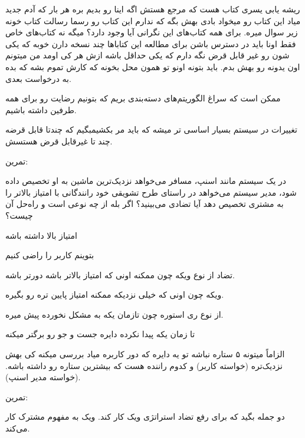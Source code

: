 ریشه یابی
یسری کتاب هست که مرجع هستش
اگه اینا رو بدیم بره
هر بار که آدم جدید میاد این کتاب رو میخواد بادی بهش بگه که ندارم این کتاب رو 
رسما رسالت کتاب خونه زیر سوال میره.
برای همه کتاب‌های این نگرانی آیا وجود دارد؟
میگه نه کتاب‌های خاص فقط
اونا باید در دسترس باشن برای مطالعه
این کتاباها چند نسخه دارن
خوبه که یکی شون رو غیر قابل قرض نگه دارم که یکی حداقل باشه ازش
هر کی اومد من میتونم اون یدونه رو بهش بدم.
باید بتونه اونو تو همون محل بخونه که کارش تموم بشه که بده به درخواست بعدی.

ممکن است که سراغ الگوریتم‌های دسته‌بندی بریم که بتونیم رضایت رو برای همه طرفین
داشته باشیم.

تغییرات در سیستم بسیار اساسی تر میشه که باید مر بکشیمبگیم که چندتا قابل قرضه چند
تا غیرقابل قرض هستسش.

تمرین:

در یک سیستم مانند اسنپ، مسافر می‌خواهد نزدیک‌ترین ماشین به او تخصیص داده شود،
مدیر سیستم می‌خواهد در راستای طرح تشویقی خود رانندگانی با امتیاز بالاتر را به
مشتری تخصیص دهد آیا تضادی می‌بینید؟ اگر بله از چه نوعی است و راه‌حل آن چیست؟

امتیاز بالا داشته باشه

بتوینم کاربر را راضی کنیم 

تضاد از نوع ویکه چون ممکنه اونی که امتیاز بالاتر باشه دورتر باشه.

ویکه چون اونی که خیلی نزدیکه ممکنه امتیاز پایین تره رو بگیره.

از نوع ری استوره چون تازمان یکه به مشکل نخورده پیش میره.

تا زمان یکه پیدا نکرده دایره جست و جو رو برگتر میکنه

الزاماً میتونه ۵ ستاره نباشه تو یه دایره که دور کاربره میاد بررسی میکنه کی بهش
نزدیک‌تره (خواسته کاربر) و کدوم راننده هست که بیشترین ستاره رو داشته باشه.
(خواسته مدیر اسنپ).

تمرین:

دو جمله بگید که برای رفع تضاد استراتژی ویک کار کند.
ویک به مفهوم مشترک کار می‌کند.







